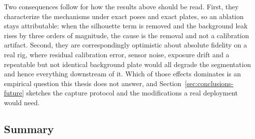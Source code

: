 Two consequences follow for how the results above should be read. First, they
characterize the mechanisms under exact poses and exact plates, so an ablation
stays attributable: when the silhouette term is removed and the
background leak rises by three orders of magnitude, the cause is the removal and
not a calibration artifact. Second, they are correspondingly optimistic about
absolute fidelity on a real rig, where residual calibration error, sensor noise,
exposure drift and a repeatable but not identical background plate would all
degrade the segmentation and hence everything downstream of it. Which of those
effects dominates is an empirical question this thesis does not answer, and
Section~\ref{sec:conclusions-future} sketches the capture protocol and the
modifications a real deployment would need.

\subsection{Summary}
\label{sec:results-summary}

